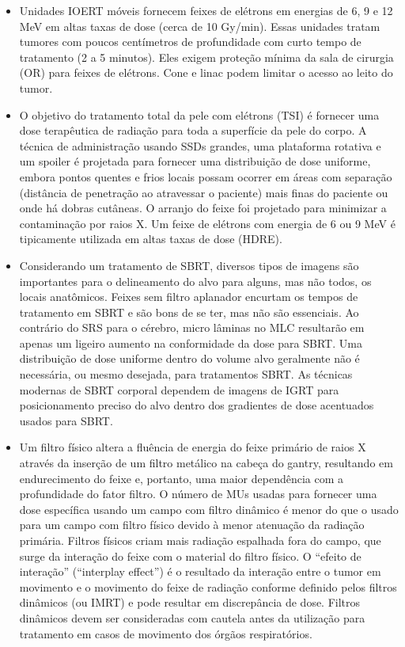 \documentclass[11pt,a4paper]{article}
\newcounter{exemplo}
\begin{document}
\begin{exemplo}[Radioterapia]
\begin{itemize}
       \item Unidades IOERT móveis fornecem feixes de elétrons em energias de 6, 9 e 12 MeV em altas taxas de dose (cerca de 10 Gy/min). Essas unidades tratam tumores com poucos centímetros de profundidade com curto tempo de tratamento (2 a 5 minutos). Eles exigem proteção mínima da sala de cirurgia (OR) para feixes de elétrons. Cone e linac podem limitar o acesso ao leito do tumor.
       
       \item O objetivo do tratamento total da pele com elétrons (TSI) é fornecer uma dose terapêutica de radiação para toda a superfície da pele do corpo. A técnica de administração usando SSDs grandes, uma plataforma rotativa e um spoiler é projetada para fornecer uma distribuição de dose uniforme, embora pontos quentes e frios locais possam ocorrer em áreas com separação (distância de penetração ao atravessar o paciente) mais finas do paciente ou onde há dobras cutâneas. O arranjo do feixe foi projetado para minimizar a contaminação por raios X. Um feixe de elétrons com energia de 6 ou 9 MeV é tipicamente utilizada em altas taxas de dose (HDRE).
       
       \item Considerando um tratamento de SBRT, diversos tipos de imagens são importantes para o delineamento do alvo para alguns, mas não todos, os locais anatômicos. Feixes sem filtro aplanador encurtam os tempos de tratamento em SBRT e são bons de se ter, mas não são essenciais. Ao contrário do SRS para o cérebro, micro lâminas no MLC resultarão em apenas um ligeiro aumento na conformidade da dose para SBRT. Uma distribuição de dose uniforme dentro do volume alvo geralmente não é necessária, ou mesmo desejada, para tratamentos SBRT. As técnicas modernas de SBRT corporal dependem de imagens de IGRT para posicionamento preciso do alvo dentro dos gradientes de dose acentuados usados para SBRT.
       
       \item Um filtro físico altera a fluência de energia do feixe primário de raios X através da inserção de um filtro metálico na cabeça do gantry, resultando em endurecimento do feixe e, portanto, uma maior dependência com a profundidade do fator filtro. O número de MUs usadas para fornecer uma dose específica usando um campo com filtro dinâmico é menor do que o usado para um campo com filtro físico devido à menor atenuação da radiação primária. Filtros físicos criam mais radiação espalhada fora do campo, que surge da interação do feixe com o material do filtro físico. O “efeito de interação” (“interplay effect”) é o resultado da interação entre o tumor em movimento e o movimento do feixe de radiação conforme definido pelos filtros dinâmicos (ou IMRT) e pode resultar em discrepância de dose. Filtros dinâmicos devem ser consideradas com cautela antes da utilização para tratamento em casos de movimento dos órgãos respiratórios.

    \end{itemize}
\end{exemplo}
\end{document}
